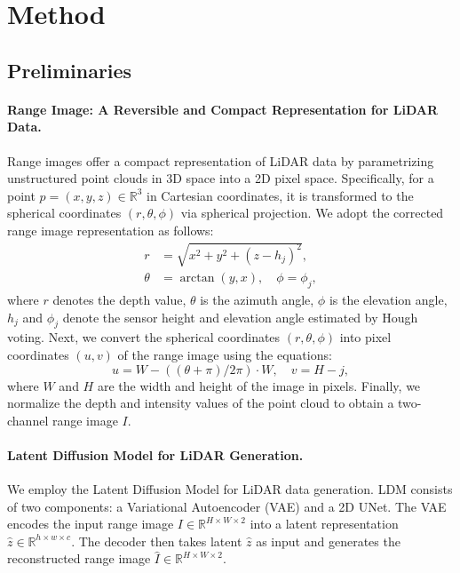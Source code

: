 \section{Method}
\label{sec:method}

\subsection{Preliminaries}
\paragraph{Range Image: A Reversible and Compact Representation for LiDAR Data.}
Range images offer a compact representation of LiDAR data by parametrizing unstructured point clouds in 3D space into a 2D pixel space. 
Specifically, for a point \( p = (x, y, z) \in \mathbb{R}^3 \) in Cartesian coordinates, it is transformed to the spherical coordinates \( (r, \theta, \phi) \) via spherical projection.
We adopt the corrected range image representation \cite{hu2024rangeldm} as follows:
\begin{equation}
\label{corrected_range}
\begin{aligned}
    r &= \sqrt{x^{2} + y^{2} + (z - h_{j})^{2}}, \\
    \theta &= \arctan(y, x), \quad \phi = \phi_{j},
\end{aligned}
\end{equation}
where \( r \) denotes the depth value, \( \theta \) is the azimuth angle, \( \phi \) is the elevation angle, \( h_{j} \) and \( \phi_{j} \) denote the sensor height and elevation angle estimated by Hough voting.
Next, we convert the spherical coordinates \( (r, \theta, \phi) \) into pixel coordinates \( (u, v) \) of the range image using the equations:
\begin{equation}
\label{rasterization_2d}
u = W - ((\theta + \pi) / 2\pi) \cdot W, \quad v = H - j,
\end{equation}
where \( W \) and \( H \) are the width and height of the image in pixels.
Finally, we normalize the depth and intensity values of the point cloud to obtain a two-channel range image \( I \).

\vspace{-2mm}
\paragraph{Latent Diffusion Model for LiDAR Generation.}
We employ the Latent Diffusion Model \cite{rombach2022high} for LiDAR data generation. 
LDM consists of two components: a Variational Autoencoder (VAE) and a 2D UNet.
The VAE encodes the input range image \( I \in \mathbb{R}^{H \times W \times 2} \) into a latent representation \( \hat{z} \in \mathbb{R}^{h \times w \times c} \). 
The decoder then takes latent \( \hat{z} \) as input and generates the reconstructed range image \( \hat{I} \in \mathbb{R}^{H \times W \times 2} \).

